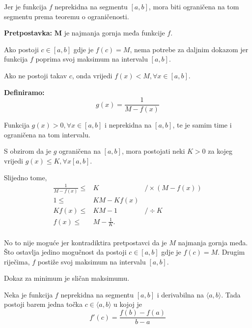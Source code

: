 Jer je funkcija $f$ neprekidna na segmentu $[a,b]$, mora biti ograničena na tom
segmentu prema teoremu o ograničenosti.

\textbf{Pretpostavka:} $\mathbf{M}$ je najmanja gornja međa funkcije $f$.

Ako postoji $c\in[a,b]$ gdje je $f(c)=M$, nema potrebe za daljnim dokazom jer
funkcija $f$ poprima svoj maksimum na intervalu $[a,b]$.

Ako ne postoji takav $c$, onda vrijedi $f(x)<M, \forall x\in [a,b]$.

\textbf{Definiramo:}
$$
g(x) = \frac{1}{M-f(x)}
$$

Funkcija $g(x)>0,\forall x \in [a,b]$ i neprekidna na $[a,b]$, te je samim time
i ograničena na tom intervalu.

S obzirom da je $g$ ograničena na $[a,b]$, mora postojati neki $K>0$ za kojeg
vrijedi $g(x)\leq K, \forall x [a,b]$.

Slijedno tome,
\begin{align*}
\frac{1}{M-f(x)}\leq& K&/\times(M-f(x))\\
1\leq& KM-Kf(x)\\
Kf(x)\leq& KM - 1&/\div K\\
f(x)\leq& M - \frac{1}{K}.\\
\end{align*}

No to nije moguće jer kontradiktira pretpostavci da je $M$ najmanja gornja međa.
Što ostavlja jedino mogučnost da postoji $c\in[a,b]$ gdje je $f(c)=M$.
Drugim riječima, $f$ postiže svoj maksimum na intervalu $[a,b]$.

Dokaz za minimum je sličan maksimumu.

\newpage
\begin{theorembox}
    Neka je funkcija $f$ neprekidna na segmentu $[a,b]$ i derivabilna na $\langle a,b \rangle$.
    Tada postoji barem jedna točka $c\in\langle a,b \rangle$ u kojoj je
    $$
        f'(c) = \frac{f(b)-f(a)}{b-a}
    $$
\end{theorembox}

